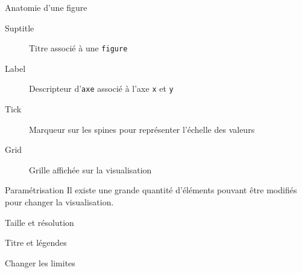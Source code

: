 \begin{frame}{Anatomie d'une figure}
    \begin{minipage}{0.49\linewidth}
        \begin{description}
            \item[Suptitle] Titre associé à une \texttt{figure}
            \item[Label] Descripteur d'\texttt{axe} associé à l'axe \texttt{x} et \texttt{y}
            \item[Tick] Marqueur sur les spines pour représenter l'échelle des valeurs
            \item[Grid] Grille affichée sur la visualisation
        \end{description}
    \end{minipage}
    \begin{minipage}{0.49\linewidth}
    \end{minipage}
\end{frame}

\begin{frame}{Paramétrisation}
    Il existe une grande quantité d'éléments pouvant être modifiés pour changer la visualisation.
\end{frame}

\begin{frame}{Taille et résolution}
    \begin{minipage}[t]{0.49\linewidth}
    \end{minipage}
    \begin{minipage}[t]{0.49\linewidth}
    \end{minipage}
\end{frame} 

\begin{frame}{Titre et légendes}
    \begin{minipage}{0.49\linewidth}
    \end{minipage}
    \begin{minipage}{0.49\linewidth}
    \end{minipage}
\end{frame}

\begin{frame}{Changer les limites}
    \begin{minipage}{0.49\linewidth}
    \end{minipage}
    \begin{minipage}{0.49\linewidth}
    \end{minipage}
\end{frame}

